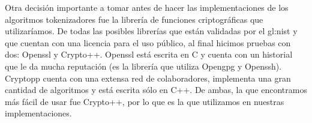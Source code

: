 Otra decisión importante a tomar antes de hacer las implementaciones de los
algoritmos tokenizadores fue la librería de funciones criptográficas que
utilizaríamos. De todas las posibles librerías que están validadas
por el \gls{gl:nist} y que cuentan con una licencia para el uso público, al
final hicimos pruebas con dos: Openssl y Crypto++. Openssl está escrita
en C y cuenta con un historial que le da mucha reputación (es la librería
que utiliza Opengpg y Openssh). Cryptopp cuenta con una extensa red de
colaboradores, implementa una gran cantidad de algoritmos y está escrita sólo
en C++. De ambas, la que encontramos más fácil de usar fue Crypto++, por lo que
es la que utilizamos en nuestras implementaciones.

